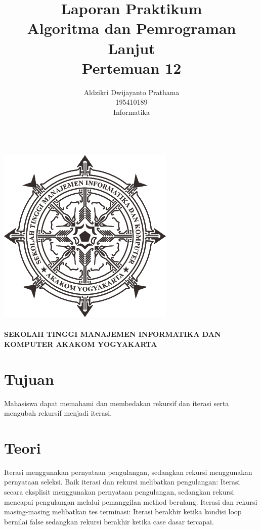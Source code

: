 \documentclass[a4paper,12pt]{article}
\begin{document}
\title{ {\Large Laporan Praktikum}\\ Algoritma dan Pemrograman Lanjut\\{\Large Pertemuan 12}}

\author{Aldzikri Dwijayanto Prathama
    \\195410189
    \\Informatika}
\makeatletter
\begin{titlepage}
    \begin{center}
        {\huge \bfseries \@title}\\[14ex]
        \includegraphics[scale=.8]{logo}\\[4ex]
        {\large \@author}\\[12ex]
        {\large \bfseries {SEKOLAH TINGGI MANAJEMEN INFORMATIKA DAN KOMPUTER
            AKAKOM YOGYAKARTA}}
    \end{center}


\end{titlepage}
\makeatother
\newpage
\tableofcontents
\newpage

\section{Tujuan}
Mahasiswa dapat  memahami dan membedakan rekursif dan iterasi serta mengubah rekursif menjadi iterasi.
\section{Teori}
Iterasi menggunakan pernyataan pengulangan, sedangkan rekursi menggunakan
pernyataan seleksi. Baik iterasi dan rekursi melibatkan pengulangan: Iterasi secara eksplisit
menggunakan pernyataan pengulangan, sedangkan rekursi mencapai pengulangan melalui pemanggilan method berulang. Iterasi
dan rekursi masing-masing melibatkan tes terminasi: Iterasi berakhir ketika kondisi loop bernilai false sedangkan
rekursi berakhir ketika case dasar tercapai.\\
\end{document}

